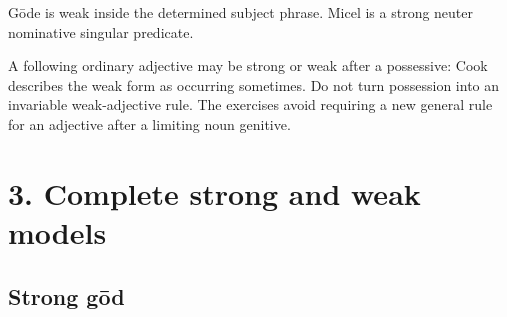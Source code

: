 Gōde is weak inside the determined subject phrase. Micel is a strong neuter nominative singular predicate.

A following ordinary adjective may be strong or weak after a possessive: Cook describes the weak form as occurring sometimes. Do not turn possession into an invariable weak-adjective rule. The exercises avoid requiring a new general rule for an adjective after a limiting noun genitive.

\clearpage
\section*{3. Complete strong and weak models}

\subsection*{Strong gōd}

